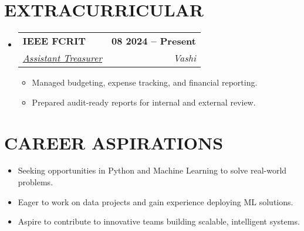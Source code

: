 \documentclass[letterpaper,11pt]{article}
\makeatletter
\newcommand{\resumeItem}[1]{
  \item\small{{#1 \vspace{-2pt}}}
}
\newcommand{\resumeSubheading}[4]{
  \vspace{-2pt}\item
    \begin{tabular*}{1.0\textwidth}[t]{l@{\extracolsep{\fill}}r}
      \textbf{\large#1} & \textbf{\small #2} \\
      \textit{\large#3} & \textit{\small #4} \\
    \end{tabular*}\vspace{-7pt}
}
\newcommand{\resumeItemListStart}{\begin{itemize}}
\newcommand{\resumeItemListEnd}{\end{itemize}\vspace{-5pt}}
\newcommand{\resumeSubHeadingListStart}{\begin{itemize}[leftmargin=0.0in, label={}]}
\newcommand{\resumeSubHeadingListEnd}{\end{itemize}}
\makeatother
\begin{document}
\section{EXTRACURRICULAR}
\resumeSubHeadingListStart
    \resumeSubheading
      {IEEE FCRIT}{08 2024 -- Present}
      {\underline{Assistant Treasurer}}{Vashi}
        \resumeItemListStart
            \resumeItem{Managed budgeting, expense tracking, and financial reporting.}
            \resumeItem{Prepared audit-ready reports for internal and external review.}
        \resumeItemListEnd
\resumeSubHeadingListEnd

\section{CAREER ASPIRATIONS}
\resumeItemListStart
    \resumeItem{Seeking opportunities in Python and Machine Learning to solve real-world problems.}
    \resumeItem{Eager to work on data projects and gain experience deploying ML solutions.}
    \resumeItem{Aspire to contribute to innovative teams building scalable, intelligent systems.}
\resumeItemListEnd
\end{document}
